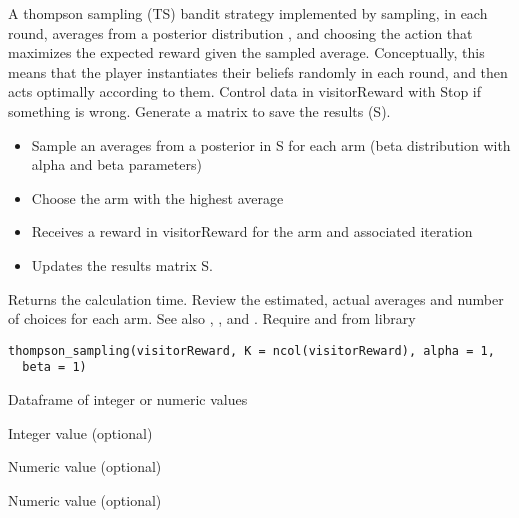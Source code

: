 \documentclass[letterpaper]{book}
\begin{document}
%
\begin{Description}\relax
A thompson sampling (TS) bandit strategy implemented by sampling, in each round, averages from a posterior
distribution  , and choosing the action that maximizes the expected reward given the
sampled average. Conceptually, this means that the player instantiates their beliefs
randomly in each round, and then acts optimally according to them.
Control data in visitorReward with 
Stop if something is wrong.
Generate a matrix to save the results (S).
\begin{itemize}
 At each iteration
\item Sample an averages from a posterior in S for each arm (beta distribution with alpha and beta parameters)
\item Choose the arm with the highest average
\item Receives a reward in visitorReward for the arm and associated iteration
\item Updates the results matrix S.

\end{itemize}

Returns the calculation time.
Review the estimated, actual averages and number of choices for each arm.
See also  , , and .
Require  and  from  library
\end{Description}
%
\begin{Usage}
\begin{verbatim}
thompson_sampling(visitorReward, K = ncol(visitorReward), alpha = 1,
  beta = 1)
\end{verbatim}
\end{Usage}
%
\begin{Arguments}
\begin{ldescription}
\item[\code{visitorReward}] Dataframe of integer or numeric values

\item[\code{K}] Integer value (optional)

\item[\code{alpha}] Numeric value (optional)

\item[\code{beta}] Numeric value (optional)
\end{ldescription}
\end{Arguments}
\end{document}
